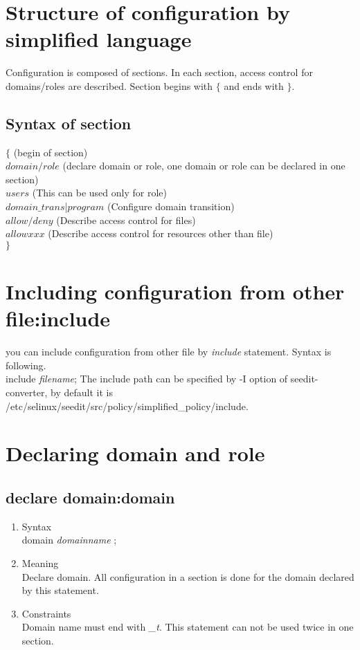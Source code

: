 \documentclass{article}
\begin{document}
\section{Structure of configuration by simplified language}
Configuration is composed of sections. In each section, access control for domains/roles are described. Section begins with $\{$ and ends with $\}$. 

\subsection{Syntax of section}

$\{$  (begin of section)\\
$domain/role$  (declare domain or role, one domain or role can be declared in one section) \\
$users$  (This can be used only for role)\\
$domain\_trans$|$program$ (Configure domain transition)\\
$allow/deny$  (Describe access control for files)\\
$allowxxx$   (Describe access control for resources other than file)\\
$\}$\\

\section{Including configuration from other file:include}
you can include configuration from other file by {\it include}
statement.
Syntax is following.\\
include {\it filename};
The include path can be specified by -I option of seedit-converter, by
default it is /etc/selinux/seedit/src/policy/simplified\_policy/include.


\section{Declaring domain and role}
\subsection{declare domain:domain}
\begin{enumerate}
 \item Syntax \\
      domain {\it domainname} ;
 \item Meaning\\
       Declare domain. All configuration in a section is done for
       the domain declared by this statement. 
 \item Constraints\\
Domain name must end with {\it \_t}. This statement can not be used twice in one section. 
\end{enumerate}
\end{document}

